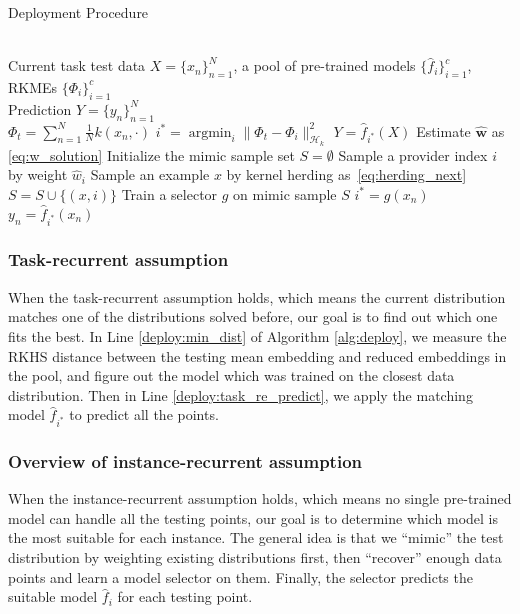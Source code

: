 \documentclass[paper=letter, fontsize=20pt]{article}
\renewcommand{\algorithmicrequire}{ \textbf{Input:}}
\renewcommand{\algorithmicensure}{ \textbf{Output:}}
\newcommand*\argmin{\mathop{\arg \min}}
\begin{document}
\begin{algorithm}[tb]
   \caption{Deployment Procedure}
   \label{alg:deploy}
\begin{algorithmic}[1]
\renewcommand{\algorithmicrequire}{\textbf{input:}}
\renewcommand{\algorithmicensure}{\textbf{output:}}
\REQUIRE~~\\
    Current task test data $X=\{x_n\}_{n=1}^{N}$, a pool of pre-trained models $\{\widehat{f}_i\}_{i=1}^c$, RKMEs $\{\Phi_i\}_{i=1}^c$
\ENSURE~~\\
  Prediction $Y=\{y_n\}_{n=1}^{N}$
\renewcommand{\algorithmicrequire}{\textbf{procedure:}}
\REQUIRE~~\\
\STATE $\Phi_t=\sum_{n=1}^{N}\frac{1}{N} k(x_n,\cdot)$
\STATE $i^*=\argmin_i \big\lVert \Phi_t-\Phi_i \big\rVert_{\mathcal{H}_k}^2$ \label{deploy:min_dist}
\STATE $Y=\widehat{f}_{i^*}(X)$ \label{deploy:task_re_predict}
\ENDIF
{}
\STATE Estimate $\widehat{\bm{w}}$ as \eqref{eq:w_solution} \label{deploy:ira_start}
\STATE Initialize the mimic sample set $S=\emptyset$ \label{deploy:sampling_start}
\STATE Sample a provider index $i$ by weight $\widehat{w}_i$ \label{deploy:pick_provider}
\STATE Sample an example $x$ by kernel herding as~\eqref{eq:herding_next} \label{deploy:herding}
\STATE $S=S\cup \{(x,i)\}$
\ENDWHILE \label{deploy:sampling_end}
\STATE Train a selector $g$ on mimic sample $S$
\STATE $i^*=g(x_n)$\label{deploy:phi_x_start} 
\STATE $y_n=\widehat{f}_{i^*}(x_n)$ \label{deploy:phi_x_end}
\ENDFOR \label{deploy:ira_end}
\ENDIF 
\end{algorithmic}
\end{algorithm}
\subsubsection{Task-recurrent assumption}
When the task-recurrent assumption holds, which means the current distribution matches one of the distributions solved before, our goal is to find out which one fits the best. In Line \ref{deploy:min_dist} of Algorithm \ref{alg:deploy}, we measure the RKHS distance between the testing mean embedding and reduced embeddings in the pool, and figure out the model which was trained on the closest data distribution. Then in Line \ref{deploy:task_re_predict}, we apply the matching model $\widehat{f}_{i^*}$ to predict all the points.

\subsubsection{Overview of instance-recurrent assumption}
When the instance-recurrent assumption holds, which means no single pre-trained model can handle all the testing points, our goal is to determine which model is the most suitable for each instance. The general idea is that we ``mimic'' the test distribution by weighting existing distributions first, then ``recover'' enough data points and learn a model selector on them. Finally, the selector predicts the suitable model $\widehat{f}_i$ for each testing point.
\end{document}
